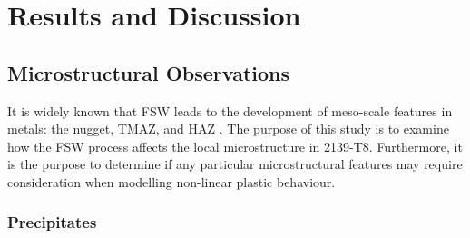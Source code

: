 	\section{Results and Discussion}
	\label{RAD}
	\subsection{Microstructural Observations}
	\label{RADMicrostructure}
	It is widely known that FSW leads to the development of meso-scale features in metals: the nugget, TMAZ, and HAZ \cite{Mishra2005}. The purpose of this study is to examine how the FSW process affects the local microstructure in 2139-T8. Furthermore, it is the purpose to determine if any particular microstructural features may require consideration when modelling non-linear plastic behaviour.
	\subsubsection{Precipitates}
	\label{RADMicrostructurePrecipitates}
	
